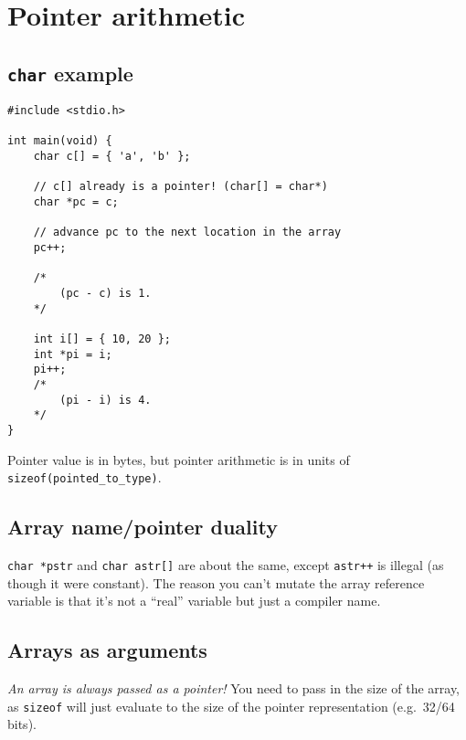 \section{Pointer arithmetic}
\subsection{\texttt{char} example}
\begin{verbatim}
#include <stdio.h>

int main(void) {
	char c[] = { 'a', 'b' };
	
	// c[] already is a pointer! (char[] = char*)
	char *pc = c;
	
	// advance pc to the next location in the array
	pc++;
	
	/*
		(pc - c) is 1.
	*/
	
	int i[] = { 10, 20 };
	int *pi = i;
	pi++;
	/*
		(pi - i) is 4.
	*/
}
\end{verbatim}
Pointer value is in bytes, but pointer arithmetic is in units of \texttt{sizeof(pointed\_to\_type)}.

\subsection{Array name/pointer duality}
\texttt{char *pstr} and \texttt{char astr[]} are about the same, except \texttt{astr++} is illegal (as though it were constant).
The reason you can't mutate the array reference variable is that it's not a ``real'' variable but just a compiler name.

\subsection{Arrays as arguments}
\emph{An array is always passed as a pointer!} You need to pass in the size of the array, as \texttt{sizeof} will just evaluate to the size of the pointer representation (e.g.~32/64 bits).